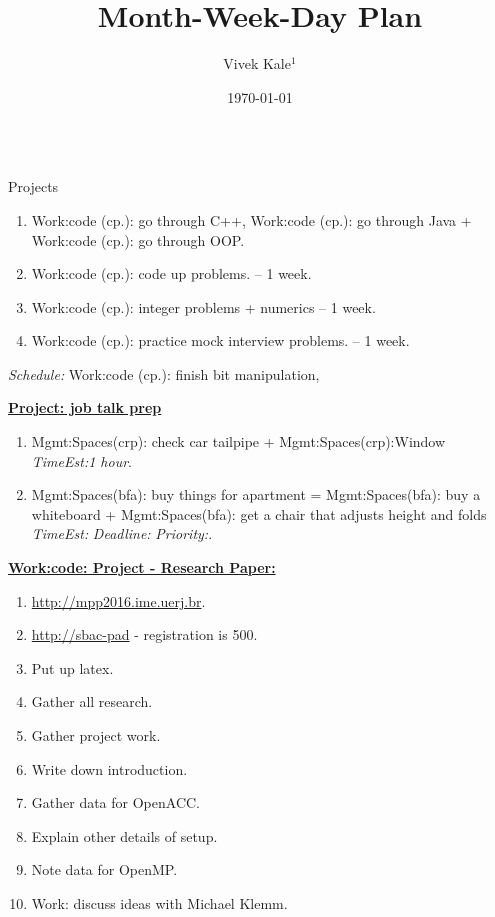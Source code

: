 \documentclass[serif, mathserif, final]{beamer}
\title{Month-Week-Day Plan}\author{Vivek Kale$^1$}\institute{$^1$ University of Illinois at Urbana-Champaign}\date{\today}
\newcommand{\te}[1]{\textit{TimeEst:}\textit{#1}}
\newcommand{\dl}[1]{\textit{Deadline:}\textit{#1}}
\newcommand{\pr}[1]{\textit{Priority:}\textit{#1}}
\begin{document}
\begin{frame}
\begin{columns}

\begin{column}{0.5\textwidth}
\begin{block}{Projects}
\begin{enumerate}
\tiny \item \tiny Work:code (cp.): go through C++, Work:code (cp.): go through Java + Work:code (cp.): go through OOP. 
\item \tiny Work:code (cp.): code up problems.  – 1 week.
\item \tiny Work:code (cp.): integer problems + numerics   -- 1 week. 
\item \tiny Work:code (cp.): practice mock interview problems. – 1 week. 
\end{enumerate}
{\it Schedule:} Work:code (cp.): finish bit manipulation,

{\underline{\bf Project: job talk prep}}
\begin{enumerate} 
\item \tiny Mgmt:Spaces(crp): check car tailpipe +
  Mgmt:Spaces(crp):Window \te{1 hour}.
\item \tiny Mgmt:Spaces(bfa): buy things for apartment =
  Mgmt:Spaces(bfa): buy a whiteboard + Mgmt:Spaces(bfa): get a chair
  that adjusts height and folds \te{} \dl{} \pr{}. 
\end{enumerate}

{\underline{\bf Work:code: Project - Research Paper:}}
\begin{enumerate}
\tiny \item \tiny \url{http://mpp2016.ime.uerj.br}. 
\item \tiny \url{http://sbac-pad}  - registration is  500.
\item \tiny Put up latex.  
\item \tiny Gather all research. 
\item \tiny Gather project work. 
\item \tiny Write down introduction.
\item \tiny Gather data for OpenACC. 
\item \tiny Explain other details of setup. 
\item \tiny Note data for OpenMP. 

\item \tiny Work: discuss ideas with Michael Klemm. 


\end{enumerate}
\end{block}
\end{column}
\end{columns}
\end{frame}
\end{document}
